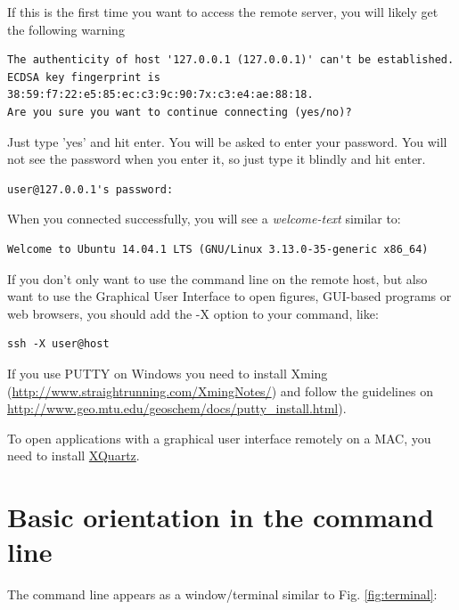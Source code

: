 \documentclass[11pt]{article}
\begin{document}
If this is the first time you want to access the remote server, you
will likely get the following warning

\begin{verbatim}
The authenticity of host '127.0.0.1 (127.0.0.1)' can't be established.
ECDSA key fingerprint is 38:59:f7:22:e5:85:ec:c3:9c:90:7x:c3:e4:ae:88:18.
Are you sure you want to continue connecting (yes/no)?
\end{verbatim}

Just type 'yes' and hit enter. You will be asked to enter your
password. You will not see the password when you enter it, so just
type it blindly and hit enter.

\begin{verbatim}
user@127.0.0.1's password:
\end{verbatim}

When you connected successfully, you will see a \emph{welcome-text} similar to:

\begin{verbatim}
Welcome to Ubuntu 14.04.1 LTS (GNU/Linux 3.13.0-35-generic x86_64)
\end{verbatim}


If you don't only want to use the command line on the remote host, but
also want to use the Graphical User Interface to open figures,
GUI-based programs or web browsers, you should add the -X option to
your command, like:

\begin{verbatim}
ssh -X user@host
\end{verbatim}

If you use PUTTY on Windows you need to install Xming
(\url{http://www.straightrunning.com/XmingNotes/}) and follow the guidelines
on \url{http://www.geo.mtu.edu/geoschem/docs/putty_install.html}).

To open applications with a graphical user interface remotely on a
MAC, you need to install \href{http://xquartz.macosforge.org/landing/}{XQuartz}.

\section{Basic orientation in the command line}
\label{sec-2}

The command line appears as a window/terminal similar to
Fig. \ref{fig:terminal}:
\end{document}
